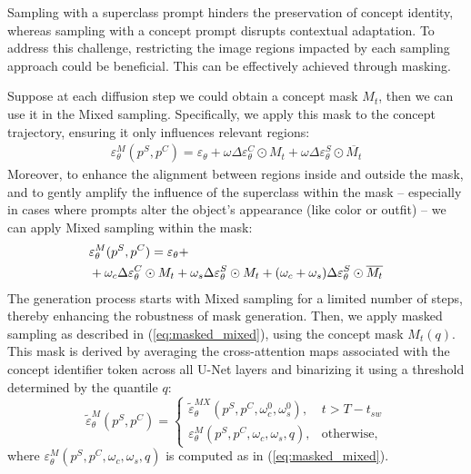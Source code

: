 Sampling with a superclass prompt hinders the preservation of concept identity, whereas sampling with a concept prompt disrupts contextual adaptation. To address this challenge, restricting the image regions impacted by each sampling approach could be beneficial. This can be effectively achieved through masking.

Suppose at each diffusion step we could obtain a concept mask $M_t$, then we can use it in the Mixed sampling. Specifically, we apply this mask to the concept trajectory, ensuring it only influences relevant regions:
\begin{align}\label{eq:masked_base}
    \varepsilon^{M}_{\theta}(p^S, p^C) = \varepsilon_{\theta} + \omega\Delta\varepsilon_{\theta}^{C} \odot M_t + \omega\Delta\varepsilon_{\theta}^{S} \odot \overline{M_t} 
\end{align}
Moreover, to enhance the alignment between regions inside and outside the mask, and to gently amplify the influence of the superclass within the mask -- especially in cases where prompts alter the object's appearance (like color or outfit) -- we can apply Mixed sampling within the mask:
\begin{align}\label{eq:masked_mixed}
    &\varepsilon^{M}_{\theta}(p^S, p^C) = \varepsilon_{\theta} + \\ &+ \omega_c\Delta\varepsilon_{\theta}^{C} \odot M_t + 
    \omega_s\Delta\varepsilon_{\theta}^{S} \odot M_t +(\omega_c + \omega_s)\Delta\varepsilon_{\theta}^{S} \odot \overline{M_t}  \notag
\end{align}
The generation process starts with Mixed sampling for a limited number of steps, thereby enhancing the robustness of mask generation. Then, we apply masked sampling as described in (\ref{eq:masked_mixed}), using the concept mask $M_t(q)$. This mask is derived by averaging the cross-attention maps associated with the concept identifier token across all U-Net layers and binarizing it using a threshold determined by the quantile $q$:
\begin{equation}\label{eq:masked_sampling}
\tilde{\varepsilon}^{M}_{\theta}(p^S, p^C) = 
    \begin{cases}
         \tilde{\varepsilon}^{MX}_{\theta}(p^S, p^C, \omega_c^0, \omega_s^0), & t > T - t_{sw}\\
         \varepsilon^{M}_{\theta}(p^S, p^C, \omega_c, \omega_s, q),
    &\text{otherwise,}
    \end{cases} 
\end{equation}
where $\varepsilon^{M}_{\theta}(p^S, p^C, \omega_c, \omega_s, q)$ is computed as in (\ref{eq:masked_mixed}). 

